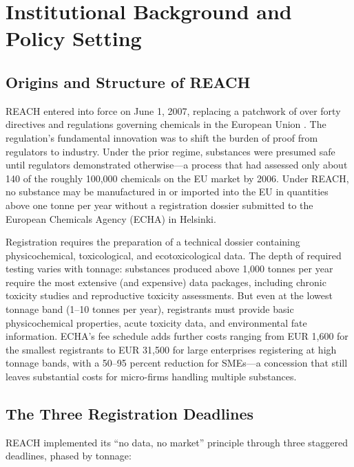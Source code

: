 \documentclass[12pt]{article}
\begin{document}
\section{Institutional Background and Policy Setting}
\label{sec:background}

\subsection{Origins and Structure of REACH}

REACH entered into force on June 1, 2007, replacing a patchwork of over forty directives and regulations governing chemicals in the European Union \citep{reach2006}. The regulation's fundamental innovation was to shift the burden of proof from regulators to industry. Under the prior regime, substances were presumed safe until regulators demonstrated otherwise---a process that had assessed only about 140 of the roughly 100,000 chemicals on the EU market by 2006. Under REACH, no substance may be manufactured in or imported into the EU in quantities above one tonne per year without a registration dossier submitted to the European Chemicals Agency (ECHA) in Helsinki.

Registration requires the preparation of a technical dossier containing physicochemical, toxicological, and ecotoxicological data. The depth of required testing varies with tonnage: substances produced above 1,000 tonnes per year require the most extensive (and expensive) data packages, including chronic toxicity studies and reproductive toxicity assessments. But even at the lowest tonnage band (1--10 tonnes per year), registrants must provide basic physicochemical properties, acute toxicity data, and environmental fate information. ECHA's fee schedule adds further costs ranging from EUR 1,600 for the smallest registrants to EUR 31,500 for large enterprises registering at high tonnage bands, with a 50--95 percent reduction for SMEs---a concession that still leaves substantial costs for micro-firms handling multiple substances.

\subsection{The Three Registration Deadlines}

REACH implemented its ``no data, no market'' principle through three staggered deadlines, phased by tonnage:
\end{document}
